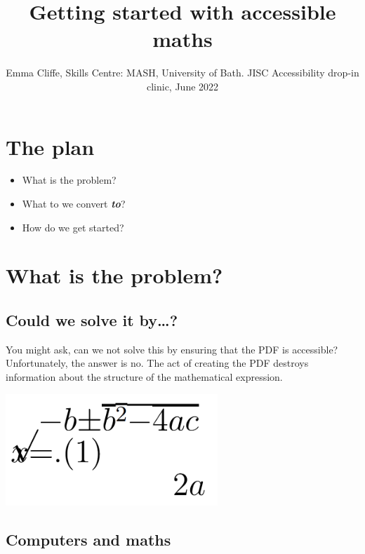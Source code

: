 \documentclass[
  12pt,
  a4paper]{extarticle}
\title{Getting started with accessible maths}
\author{Emma Cliffe, Skills Centre: MASH, University of Bath. JISC Accessibility drop-in clinic, June 2022}
\date{}
\providecommand{\tightlist}{%
  \setlength{\itemsep}{0pt}\setlength{\parskip}{0pt}}
\renewcommand{\;}{\,}
\begin{document}
\maketitle

{
\setcounter{tocdepth}{2}
\tableofcontents
}
\newpage
{}

\hypertarget{the-plan}{%
\section*{The plan}\label{the-plan}}

\begin{itemize}
\tightlist
\item
  What is the problem?
\item
  What to we convert \textbf{\emph{to}}?
\item
  How do we get started?
\end{itemize}

\hypertarget{what-is-the-problem}{%
\section{What is the problem?}\label{what-is-the-problem}}

\hypertarget{could-we-solve-it-by}{%
\subsection{Could we solve it by\ldots?}\label{could-we-solve-it-by}}

You might ask, can we not solve this by ensuring that the PDF is accessible? Unfortunately, the answer is no. The act of creating the PDF destroys information about the structure of the mathematical expression.

\includegraphics[width=0.6\textwidth,height=\textheight]{./reflowing.png}

\hypertarget{computers-and-maths}{%
\subsection{Computers and maths}\label{computers-and-maths}}
\end{document}
